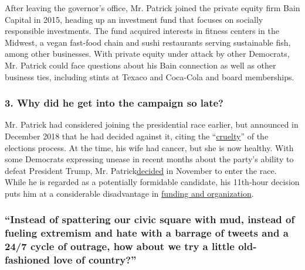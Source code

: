 After leaving the governor's office, Mr. Patrick joined the private
equity firm Bain Capital in 2015, heading up an investment fund that
focuses on socially responsible investments. The fund acquired interests
in fitness centers in the Midwest, a vegan fast-food chain and sushi
restaurants serving sustainable fish, among other businesses. With
private equity under attack by other Democrats, Mr. Patrick could face
questions about his Bain connection as well as other business ties,
including stints at Texaco and Coca-Cola and board memberships.

\hypertarget{3-why-did-he-get-into-the-campaign-so-late}{%
\subsubsection{\texorpdfstring{\textbf{3. Why did he get into the
campaign so
late?}}{3. Why did he get into the campaign so late?}}\label{3-why-did-he-get-into-the-campaign-so-late}}

Mr. Patrick had considered joining the presidential race earlier, but
announced in December 2018 that he had decided against it, citing the
``\href{https://www.nytimes.com/2018/12/05/us/politics/deval-patrick-president-2020.html}{cruelty}''
of the elections process. At the time, his wife had cancer, but she is
now healthy. With some Democrats expressing unease in recent months
about the party's ability to defeat President Trump, Mr.
Patrick\href{https://www.nytimes.com/2019/11/13/us/politics/deval-patrick-2020.html}{}\href{https://www.nytimes.com/2019/11/13/us/politics/deval-patrick-2020.html}{decided}
in November to enter the race. While he is regarded as a potentially
formidable candidate, his 11th-hour decision puts him at a considerable
disadvantage in
\href{https://www.nytimes.com/2019/11/14/us/politics/deval-patrick-campaign.html}{funding
and organization}.

\hypertarget{instead-of-spattering-our-civic-square-with-mud-instead-of-fueling-extremism-and-hate-with-a-barrage-of-tweets-and-a-247-cycle-of-outrage-how-about-we-try-a-little-old-fashioned-love-of-country}{%
\subsubsection{``Instead of spattering our civic square with mud,
instead of fueling extremism and hate with a barrage of tweets and a
24/7 cycle of outrage, how about we try a little old-fashioned love of
country?''}\label{instead-of-spattering-our-civic-square-with-mud-instead-of-fueling-extremism-and-hate-with-a-barrage-of-tweets-and-a-247-cycle-of-outrage-how-about-we-try-a-little-old-fashioned-love-of-country}}

